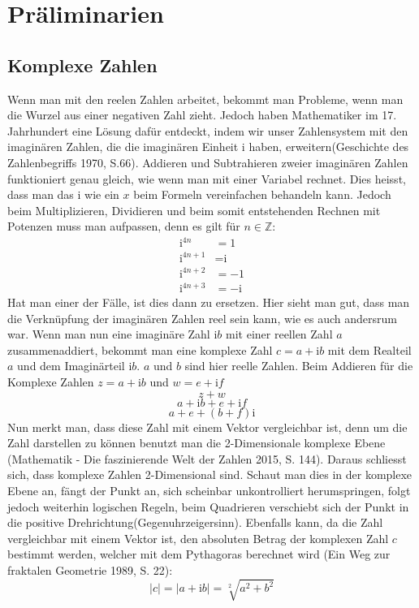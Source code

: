 \section{Präliminarien}
\subsection{Komplexe Zahlen}
Wenn man mit den reelen Zahlen arbeitet, bekommt man Probleme, wenn man die Wurzel aus einer negativen Zahl zieht. Jedoch haben Mathematiker im 17. Jahrhundert eine Lösung dafür entdeckt, indem wir unser Zahlensystem mit den imaginären Zahlen, die die imaginären Einheit i haben, erweitern(Geschichte des Zahlenbegriffs 1970, S.66). Addieren und Subtrahieren zweier imaginären Zahlen funktioniert genau gleich, wie wenn man mit einer Variabel rechnet. Dies heisst, dass man das i wie ein $x$ beim Formeln vereinfachen behandeln kann. Jedoch beim Multiplizieren, Dividieren und beim somit entstehenden Rechnen mit Potenzen muss man aufpassen, denn es gilt für $n \in \mathbb{Z}$:
\begin{align*}
 \text{i}^{4n} &= 1 \\
\text{i}^{4n+1} &= \text{i} \\
\text{i}^{4n+2} &= -1 \\
\text{i}^{4n+3} &= -\text{i}
\end{align*}
Hat man einer der Fälle, ist dies dann zu ersetzen. Hier sieht man gut, dass man die Verknüpfung der imaginären Zahlen reel sein kann, wie es auch andersrum war. Wenn man nun eine imaginäre Zahl $\text{i}b$ mit einer reellen Zahl $a$ zusammenaddiert, bekommt man eine komplexe Zahl  $c=a+\text{i}b$ mit dem Realteil $a$ und dem Imaginärteil $\text{i}b$. $a$ und $b$ sind hier reelle Zahlen. Beim Addieren für die Komplexe Zahlen $z=a+\text{i}b$ und $w=e+\text{i}f$
\[z+w\]
\[a+\text{i}b+e+\text{i}f\]
\[a+e+(b+f)\text{i}\]
Nun merkt man, dass diese Zahl mit einem Vektor vergleichbar ist, denn um die Zahl darstellen zu können benutzt man die 2-Dimensionale komplexe Ebene (Mathematik - Die faszinierende Welt der Zahlen 2015, S. 144). Daraus schliesst sich, dass komplexe Zahlen 2-Dimensional sind. Schaut man dies in der komplexe Ebene an, fängt der Punkt an, sich scheinbar unkontrolliert herumspringen, folgt jedoch weiterhin logischen Regeln, beim Quadrieren verschiebt sich der Punkt in die positive Drehrichtung(Gegenuhrzeigersinn). Ebenfalls kann, da die Zahl vergleichbar mit einem Vektor ist, den absoluten Betrag der komplexen Zahl $c$ bestimmt werden, welcher mit dem Pythagoras berechnet wird (Ein Weg zur fraktalen Geometrie 1989, S. 22):
\[|c| = |a+\text{i}b| = \sqrt[2]{a^2+b^2}\]

